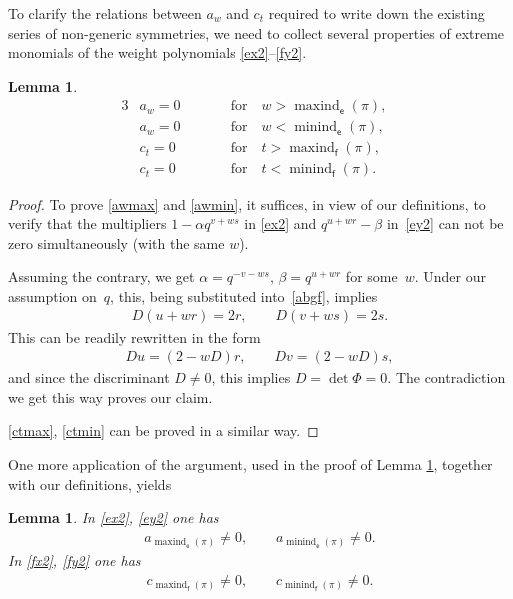 \documentclass[pdftex]{sigma}
\numberwithin{equation}{section}
\newtheorem{Lemma}[Theorem]{Lemma}
\begin{document}
To clarify the relations between $a_w$ and $c_t$ required to write down the existing series of non-generic symmetries, we need to collect several properties of extreme monomials of the weight polynomials \eqref{ex2}--\eqref{fy2}.

\begin{Lemma}\label{ac_0}
\begin{alignat}{3}
&a_w=0 \qquad && \text{for} \quad w >\operatorname{maxind}_\mathsf{e}(\pi),&\label{awmax}\\
& a_w =0 \qquad &&\text{for} \quad w <\operatorname{minind}_\mathsf{e}(\pi),&\label{awmin}\\
& c_t =0 \qquad &&\text{for} \quad t >\operatorname{maxind}_\mathsf{f}(\pi),&\label{ctmax}\\
& c_t =0 \qquad && \text{for} \quad t <\operatorname{minind}_\mathsf{f}(\pi). &\label{ctmin}
\end{alignat}
\end{Lemma}

\begin{proof}To prove \eqref{awmax} and \eqref{awmin}, it suffices, in view of our definitions, to verify that the multipliers $1-\alpha q^{v+ws}$ in \eqref{ex2} and $q^{u+wr}-\beta$ in~\eqref{ey2} can not be zero simultaneously (with the same $w$).

Assuming the contrary, we get $\alpha=q^{-v-ws}$, $\beta=q^{u+wr}$ for some~$w$. Under our assumption on~$q$, this, being substituted into~\eqref{abgf}, implies
\begin{gather*}
D(u+wr) =2r, \qquad D(v+ws) =2s.
\end{gather*}
This can be readily rewritten in the form
\begin{gather*}
Du =(2-wD)r,\qquad Dv=(2-wD)s,
\end{gather*}
and since the discriminant $D\ne 0$, this implies $D=\det\Phi=0$. The contradiction we get this way proves our claim.

\eqref{ctmax}, \eqref{ctmin} can be proved in a similar way.
\end{proof}

One more application of the argument, used in the proof of Lemma \ref{ac_0}, together with our definitions, yields

\begin{Lemma}\label{ecnz}
In \eqref{ex2}, \eqref{ey2} one has
\begin{gather*}
a_{\operatorname{maxind}_\mathsf{e}(\pi)}\ne 0,\qquad a_{\operatorname{minind}_\mathsf{e}(\pi)}\ne 0.
\end{gather*}
In \eqref{fx2}, \eqref{fy2} one has
\begin{gather*}
c_{\operatorname{maxind}_\mathsf{f}(\pi)}\ne 0,\qquad c_{\operatorname{minind}_\mathsf{f}(\pi)}\ne 0.
\end{gather*}
\end{Lemma}
\end{document}
